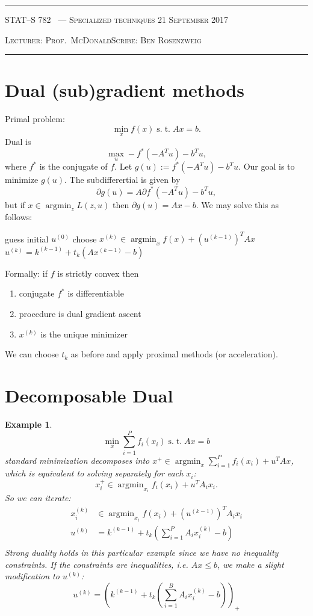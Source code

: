 \documentclass[10pt]{article}
\newcounter{lecnum}
\newtheorem{example}[ex]{Example}
\DeclareMathOperator*{\argmin}{argmin}
\newcommand{\st}{\ensuremath{\;\mathrm{s.}\;\mathrm{t.}\;}}
\newcommand{\lecturer}{Prof.\ McDonald}
\newcommand{\scribe}{Ben Rosenzweig}
\newcommand{\chtitle}{Specialized techniques}
\newcommand{\lecdate}{21 September 2017}
\begin{document}
\rule{6.5in}{1pt}

\textsc{STAT--S 782
        \hfill \thelecnum\ --- \chtitle
        \hfill \lecdate}

\textsc{Lecturer: \lecturer \hfill Scribe: \scribe}
\rule{6.5in}{1pt}

\section{Dual (sub)gradient methods}
Primal problem:
\[\min_xf(x) \st Ax=b.\]
Dual is \[\max_u -f^*(-A^Tu)-b^Tu,\]
where $f^*$ is the conjugate of $f$.  Let $g(u):=f^*(-A^Tu)-b^Tu$. Our goal is to minimize $g(u)$.
The subdifferertial is given by
\[
\partial g(u)= A\partial f^*(-A^Tu)-b^Tu, 
\]
but if $x\in\argmin_z L(z,u)$ then $\partial g(u)={Ax-b}$.  We may solve this as follows:

\begin{algorithmic}
\STATE  guess initial $u^{(0)}$
\STATE choose $x^{(k)}\in\argmin_xf(x)+(u^{(k-1)})^TAx$
\STATE $u^{(k)} = k^{(k-1)}+t_k\left(Ax^{(k-1)}-b\right)$
\ENDFOR
\end{algorithmic}

Formally: if $f$ is strictly convex then
\begin{enumerate}
\item conjugate $f^*$ is differentiable
\item procedure is dual gradient ascent
\item $x^{(k)}$ is the unique minimizer
\end{enumerate}
We can choose $t_k$ as before and apply proximal methods (or acceleration).

\section{Decomposable Dual}
\begin{example}
  \[ \min_x \sum_{i=1}^P f_i(x_i) \st Ax=b \]
  standard minimization decomposes into $x^+\in\argmin_x\sum_{i=1}^P f_i(x_i) + u^TAx$, which is equivalent to solving separately for each $x_i$:
  \[ x^+_i\in\argmin_{x_i}f_i(x_i)+u^TA_ix_i. \]
So we can iterate:
\begin{align*}
x_i^{(k)}&\in\argmin_{x_i}f(x_i)+(u^{(k-1)})^TA_ix_i\\ 
u^{(k)} &= k^{(k-1)}+t_k\left(\sum_{i=1}^P A_ix_i^{(k)}-b \right)\\
\end{align*}
Strong duality holds in this particular example since we have no inequality constraints.
If the constraints are inequalities, i.e. $Ax\leq b$, we make a slight modification to $u^{(k)}$:
\[
u^{(k)} = \left(k^{(k-1)}+t_k\left(\sum_{i=1}^B A_ix_i^{(k)}-b \right)\right)_+
\]
\end{example}
\end{document}
